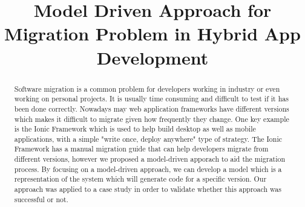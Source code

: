 \documentclass[conference]{IEEEtran}
\begin{document}
\title{Model Driven Approach for Migration Problem in Hybrid App Development\\}

\author{
\and

\and

\and

}

\maketitle

\begin{abstract}
Software migration is a common problem for developers working in industry or even working on personal projects. It is usually time consuming
and difficult to test if it has been done correctly. Nowadays may web application frameworks have different versions which makes it difficult
to migrate given how frequently they change. One key example is the Ionic Framework which is used to help build desktop as well as mobile applications,
with a simple "write once, deploy anywhere" type of strategy. The Ionic Framework has a manual migration guide that can help developers migrate from 
different versions, however we proposed a model-driven apporach to aid the migration process. By focusing on a model-driven approach, we can develop a model
which is a representation of the system which will generate code for a specific version. Our approach was applied to a case study in order to validate
whether this approach was successful or not. 
\end{abstract}
\end{document}
